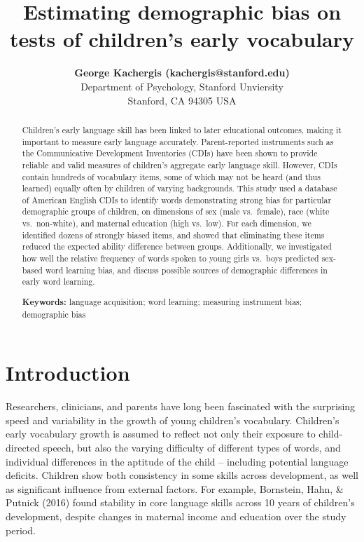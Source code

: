 \documentclass[10pt, letterpaper]{article}
\title{Estimating demographic bias on tests of children's early vocabulary}
\author{{\large \bf George Kachergis (kachergis@stanford.edu)} \AND {\large \bf Nathan Francis (nathan99@stanford.edu)} \AND {\large \bf Michael C. Frank (mcfrank@stanford.edu)} \\ Department of Psychology, Stanford Unviersity \\ Stanford, CA 94305 USA }
\begin{document}
\maketitle

\begin{abstract}
Children's early language skill has been linked to later educational
outcomes, making it important to measure early language accurately.
Parent-reported instruments such as the Communicative Development
Inventories (CDIs) have been shown to provide reliable and valid
measures of children's aggregate early language skill. However, CDIs
contain hundreds of vocabulary items, some of which may not be heard
(and thus learned) equally often by children of varying backgrounds.
This study used a database of American English CDIs to identify words
demonstrating strong bias for particular demographic groups of children,
on dimensions of sex (male vs.~female), race (white vs.~non-white), and
maternal education (high vs.~low). For each dimension, we identified
dozens of strongly biased items, and showed that eliminating these items
reduced the expected ability difference between groups. Additionally, we
investigated how well the relative frequency of words spoken to young
girls vs.~boys predicted sex-based word learning bias, and discuss
possible sources of demographic differences in early word learning.

\textbf{Keywords:}
language acquisition; word learning; measuring instrument bias;
demographic bias
\end{abstract}

\hypertarget{introduction}{%
\section{Introduction}\label{introduction}}

Researchers, clinicians, and parents have long been fascinated with the
surprising speed and variability in the growth of young children's
vocabulary. Children's early vocabulary growth is assumed to reflect not
only their exposure to child-directed speech, but also the varying
difficulty of different types of words, and individual differences in
the aptitude of the child -- including potential language deficits.
Children show both consistency in some skills across development, as
well as significant influence from external factors. For example,
Bornstein, Hahn, \& Putnick (2016) found stability in core language
skills across 10 years of children's development, despite changes in
maternal income and education over the study period.
\end{document}
